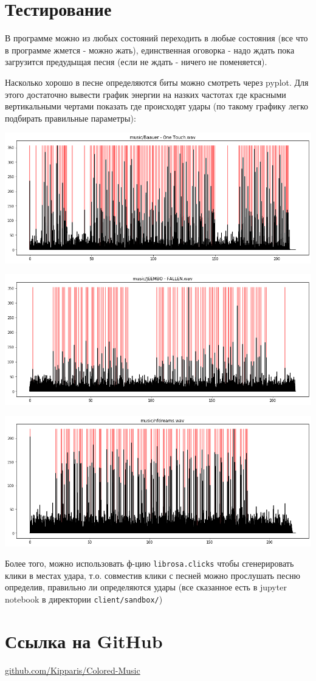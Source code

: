 \section*{Тестирование}

В программе можно из любых состояний переходить в любые состояния (все что в программе жмется - можно жать), единственная оговорка - надо ждать пока загрузится предудыщая песня (если не ждать - ничего не поменяется).
\par Насколько хорошо в песне определяются биты можно смотреть через pyplot. Для этого достаточно вывести график энергии на назких частотах где красными вертикальными чертами показать где происходят удары (по такому графику легко подбирать правильные параметры):

\par\includegraphics[scale=.6]{"src/pics/1.png"}
\par\includegraphics[scale=.6]{"src/pics/2.png"}
\par\includegraphics[scale=.6]{"src/pics/3.png"}

\par Более того, можно использовать ф-цию \verb|librosa.clicks| чтобы сгенерировать клики в местах удара, т.о. совместив клики с песней можно прослушать песню определив, правильно ли определяются удары (все сказанное есть в jupyter notebook в директории \verb|client/sandbox/|)
\section*{Ссылка на GitHub}
\href{https://github.com/Kipparis/Colored-Music}{github.com/Kipparis/Colored-Music}
\pagebreak
